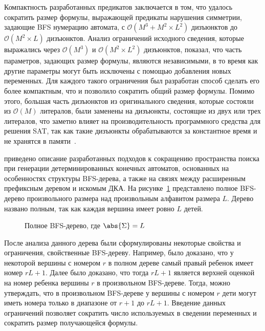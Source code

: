 Компактность разработанных предикатов заключается в том, что удалось сократить размер формулы, выражающей предикаты нарушения симметрии, задающие BFS нумерацию автомата, с $\mathcal{O}\left(M^{3} + M^{2} \times L^{2}\right)$ дизъюнктов до $\mathcal{O}\left(M^{2} \times L\right)$ дизъюнктов.
Анализ ограничений исходного сведения, которые выражались через $\mathcal{O}\left(M^{3}\right)$ и $\mathcal{O}\left(M^{2} \times L^{2}\right)$ дизъюнктов, показал, что часть параметров, задающих размер формулы, являются независимыми, в то время как другие параметры могут быть исключены с помощью добавления новых переменных. 
Для каждого такого ограничения был разработан способ сделать его более компактным, что и позволило сократить общий размер формулы.
Помимо этого, б\emph{о}льшая часть дизъюнктов из оригинального сведения, которые состояли из $\mathcal{O}\left(M\right)$ литералов,
были заменены на дизъюнкты, состоящие из двух или трех литералов, что заметно влияет на производительность программного средства для решения SAT, так как такие дизъюнкты обрабатываются за константное время и не хранятся в памяти~\cite{MSilva-SATbook09}.

\insection{\ref{sec:space:pruning}} приведено описание разработанных подходов к сокращению пространства поиска при генерации детерминированных конечных автоматов, основанных на особенностях структуры BFS-дерева, а также на связях между расширенным префиксным деревом и искомым ДКА.
На рисунке~\ref{syn:img:full-bfs} представлено полное BFS-дерево произвольного размера над произвольным алфавитом размера $L$.
Дерево названо полным, так как каждая вершина имеет ровно $L$ детей.

\begin{figure}[ht]
  \centering
  \scalebox{0.625}{}
  \caption{Полное BFS-дерево, где $\abs{\Sigma}=L$}
  \label{syn:img:full-bfs}
\end{figure}

После анализа данного дерева были сформулированы некоторые свойства и ограничения, свойственные BFS-дереву.
Например, было доказано, что у некоторой вершины с номером $r$ в полном дереве самый правый ребенок имеет номер $rL + 1$.
Далее было доказано, что тогда $rL + 1$ является верхней оценкой на номер ребенка вершины $r$ в произвольном BFS-дереве.
Тогда, можно утверждать, что в произвольном BFS-дереве у вершины с номером $r$ дети могут иметь номера только в диапазоне от $r + 1$ до $rL + 1$.
Введение данных ограничений позволяет сократить число используемых в сведении переменных и сократить размер получающейся формулы.

